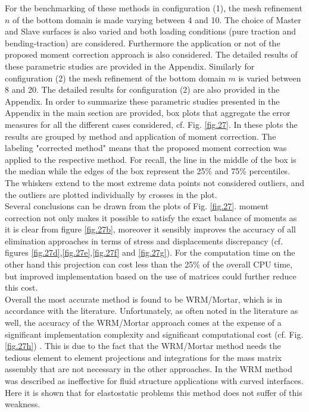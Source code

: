  For the benchmarking of these methods in configuration (1), the mesh refinement $n$ of the bottom domain is made varying between 4 and 10.  The choice of Master and Slave surfaces is also varied and both loading conditions (pure traction and bending-traction) are considered. Furthermore the application or not of the proposed moment correction approach is also considered. The detailed results of these parametric studies are provided in the Appendix.  Similarly for configuration (2) the mesh refinement of the bottom domain $m$ is varied between 8 and 20. The detailed results for configuration (2) are also provided in the Appendix. In order to summarize these parametric studies presented in the Appendix in the main section are provided, box plots that aggregate the error measures for all the different cases considered, cf. Fig. \ref{fig.27}. In these plots the results are grouped by method and application of moment correction. The labeling "corrected method" means that the proposed moment correction was applied to the respective method. For recall, the line in the middle of the box is the median while the edges of the box represent the 25\% and 75\% percentiles. The whiskers extend to the most extreme data points not considered outliers, and the outliers are plotted individually by crosses in the plot.
 \\
 Several conclusions can be drawn from the plots of Fig. \ref{fig.27}.
  moment correction not only makes it possible to satisfy the exact balance of moments as it is clear from figure \ref{fig.27b}, moreover it sensibly improves the accuracy of all elimination approaches in terms of stress and displacements discrepancy (cf. figures \ref{fig.27d},\ref{fig.27e},\ref{fig.27f} and \ref{fig.27g}). For the computation time on the other hand this projection can cost less than the 25$\%$ of the overall CPU time, but improved implementation based on the use of matrices could further reduce this cost.   
 \\
 Overall the most accurate method is found to be WRM/Mortar, which is in accordance with the literature. Unfortunately, as often noted in the literature as well, the accuracy of the WRM/Mortar approach comes at the expense of a significant implementation complexity and significant computational cost (cf. Fig. \ref{fig.27h}) . This is due to the fact that the WRM/Mortar method needs the tedious element to element projections and integrations for the mass matrix assembly that are not necessary in the other approaches. In \cite{de2007review} the WRM method was described as ineffective for fluid structure applications with curved interfaces. Here  it is shown that for elastostatic problems this method does not suffer of this weakness. 
